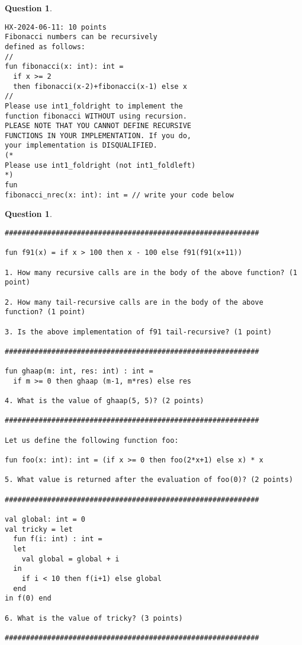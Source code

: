 \documentclass[12pt,fullpage]{article}
\newtheorem{question}[lemma]{Question}
\begin{document}
\vfill\newpage

\begin{question}~~
\begin{verbatim}  
HX-2024-06-11: 10 points
Fibonacci numbers can be recursively
defined as follows:
//
fun fibonacci(x: int): int =
  if x >= 2
  then fibonacci(x-2)+fibonacci(x-1) else x
//
Please use int1_foldright to implement the
function fibonacci WITHOUT using recursion.
PLEASE NOTE THAT YOU CANNOT DEFINE RECURSIVE
FUNCTIONS IN YOUR IMPLEMENTATION. If you do,
your implementation is DISQUALIFIED.
(*
Please use int1_foldright (not int1_foldleft)
*)
fun
fibonacci_nrec(x: int): int = // write your code below
\end{verbatim}
\end{question}

\vfill\newpage

\begin{question}~~
\begin{verbatim}  
############################################################

fun f91(x) = if x > 100 then x - 100 else f91(f91(x+11))

1. How many recursive calls are in the body of the above function? (1 point)

2. How many tail-recursive calls are in the body of the above function? (1 point)

3. Is the above implementation of f91 tail-recursive? (1 point)

############################################################

fun ghaap(m: int, res: int) : int =
  if m >= 0 then ghaap (m-1, m*res) else res

4. What is the value of ghaap(5, 5)? (2 points)

############################################################

Let us define the following function foo:

fun foo(x: int): int = (if x >= 0 then foo(2*x+1) else x) * x

5. What value is returned after the evaluation of foo(0)? (2 points)

############################################################

val global: int = 0
val tricky = let
  fun f(i: int) : int =
  let
    val global = global + i
  in
    if i < 10 then f(i+1) else global
  end
in f(0) end

6. What is the value of tricky? (3 points)

############################################################
\end{verbatim}
\end{question}
\end{document}
